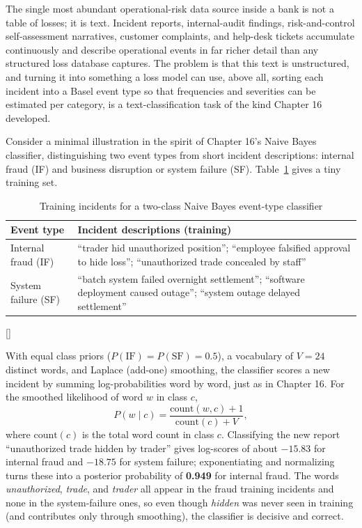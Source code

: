 \documentclass[../ai_in_finance]{subfiles}
\begin{document}
The single most abundant operational-risk data source inside a bank is not a table of losses; it is text. Incident reports, internal-audit findings, risk-and-control self-assessment narratives, customer complaints, and help-desk tickets accumulate continuously and describe operational events in far richer detail than any structured loss database captures. The problem is that this text is unstructured, and turning it into something a loss model can use, above all, sorting each incident into a Basel event type so that frequencies and severities can be estimated per category, is a text-classification task of the kind Chapter 16 developed.

Consider a minimal illustration in the spirit of Chapter 16's Naive Bayes classifier, distinguishing two event types from short incident descriptions: internal fraud (IF) and business disruption or system failure (SF). Table~\ref{tab:oprisk-nb} gives a tiny training set.

\begin{table}[htbp]
\centering
\begin{lrbox}{\bookmeasuredbox}
\begin{tabular}{p{3.0cm}p{9.5cm}}
\toprule
Event type & Incident descriptions (training) \\
\midrule
Internal fraud (IF) & ``trader hid unauthorized position''; ``employee falsified approval to hide loss''; ``unauthorized trade concealed by staff'' \\
System failure (SF) & ``batch system failed overnight settlement''; ``software deployment caused outage''; ``system outage delayed settlement'' \\
\bottomrule
\end{tabular}
\end{lrbox}
\ifdim\wd\bookmeasuredbox<0.65\linewidth
\setlength{\bookcapwidth}{0.65\linewidth}
\else
\setlength{\bookcapwidth}{\wd\bookmeasuredbox}
\fi
{}[\bookcapwidth]{
\usebox{\bookmeasuredbox}
}{
\caption{Training incidents for a two-class Naive Bayes event-type classifier}
\label{tab:oprisk-nb}
}
\end{table}

With equal class priors ($P(\text{IF}) = P(\text{SF}) = 0.5$), a vocabulary of $V = 24$ distinct words, and Laplace (add-one) smoothing, the classifier scores a new incident by summing log-probabilities word by word, just as in Chapter 16. For the smoothed likelihood of word $w$ in class $c$,
\begin{equation*}
P(w \mid c) = \frac{\text{count}(w, c) + 1}{\text{count}(c) + V},
\end{equation*}
where $\text{count}(c)$ is the total word count in class $c$. Classifying the new report ``unauthorized trade hidden by trader'' gives log-scores of about $-15.83$ for internal fraud and $-18.75$ for system failure; exponentiating and normalizing turns these into a posterior probability of \textbf{0.949} for internal fraud. The words \emph{unauthorized}, \emph{trade}, and \emph{trader} all appear in the fraud training incidents and none in the system-failure ones, so even though \emph{hidden} was never seen in training (and contributes only through smoothing), the classifier is decisive and correct.
\end{document}
